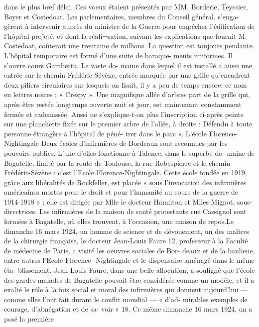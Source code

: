 \documentclass[a4paper,11pt]{book}
\begin{document}
dans le plus bref délai. Ces voeux étaient présentés par
MM. Borderie, Teyssier, Boyer et Costedoat.
Les parlementaires, membres du Conseil général, s'enga-
gèrent à intervenir auprès du ministre de la Guerre pour
empêcher l'édification de l'hôpital projeté, et dont la réali¬sation, suivant les explications que fournit M. Costedoat,
coûterait une trentaine de millions.
La question est toujours pendante.
L'hôpital temporaire est formé d'une suite de baraque-
ments uniformes. Il s'ouvre cours Gambetta. Le vaste do-
maine dans lequel il est installé a aussi une entrée sur le
chemin Frédéric-Sévène, entrée marquée par une grille
qu'encadrent deux piliers circulaires sur lesquels on lisait,
il y a peu de temps encore, ce nom en lettres noires :
« Crespy ».
Une magnifique allée d'arbres part de la grille qui,
après être restée longtemps ouverte nuit et jour, est
maintenant constamment fermée et cadenassée. Aussi ne
s'explique-t-on plus l'inscription ci-après peinte sur une
planchette fixée sur le premier arbre de l'allée, à droite :
Défendu à toute personne étrangère à l'hôpital de péné-
trer dans le parc ».
L'école Florence-Nightingale
Deux écoles d'infirmières de Bordeaux sont reconnues
par les pouvoirs publics.
L'une d'elles fonctionne à Talence, dans le superbe do-
maine de Bagatelle, limité par la route de Toulouse, la
rue Robespierre et le chemin Frédéric-Sévène : c'est
l'Ecole Florence-Nightingale.
Cette école fondée en 1919, grâce aux libéralités de
Rockfeller, est placée « sous l'invocation des infirmières
américaines mortes pour le droit et pour l'humanité au
cours de la guerre de 1914-1918 » ; elle est dirigée par
Mlle le docteur Hamilton et Mlles Mignot, sous-directrices.
Les infirmières de la maison de santé protestante rue
Cassignol sont formées à Bagatelle, où elles trouvent, à
l'occasion, une maison de repos.Le dimanche 16 mars 1924, un homme de science et de
dévouement, un des maîtres de la chirurgie française, le
docteur Jean-Louis Faure 12, professeur à la Faculté de
médecine de Paris, a visité les oeuvres sociales de Bor-
deaux et de la banlieue, entre autres l'Ecole Florence-
Nightingale et le dispensaire aménagé dans le même éta-
blissement.
Jean-Louis Faure, dans une belle allocution, a souligné
que l'école des gardes-malades de Bagatelle pouvait être
considérée comme un modèle, et il a exalté le rôle à la
fois social et moral des infirmières qui donnent aujourd'hui
— comme elles l'ont fait durant le conflit mondial — « d'ad-
mirables exemples de courage, d'abnégation et de sa-
voir » 18.
Ce même dimanche 16 mars 1924, on a posé la première
\end{document}
